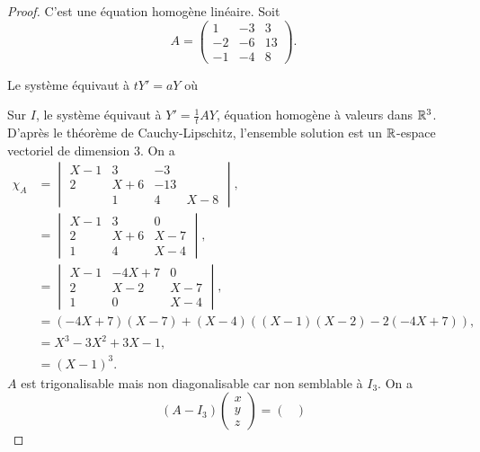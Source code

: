 \documentclass[12pt]{article}
\begin{document}
\begin{proof}
	C'est une équation homogène linéaire. Soit 
	\begin{equation}
		A=
		\begin{pmatrix}
			1&-3&3\\
			-2&-6&13\\
			-1&-4&8
		\end{pmatrix}.
	\end{equation}

	Le système équivaut à $tY'=aY$ où 

	Sur $I$, le système équivaut à $Y'=\frac{1}{t}AY$, équation homogène à valeurs dans $\mathbb{R}^{3}$. D'après le théorème de Cauchy-Lipschitz, l'ensemble solution est un $\mathbb{R}$-espace vectoriel de dimension 3. On a 
	\begin{align}
		\chi_{A}
		&=
		\begin{vmatrix}
			X-1&3&-3\\
			2&X+6&-13\\
			&1&4&X-8
		\end{vmatrix},\\
		&=
		\begin{vmatrix}
			X-1 &3&0\\
			2&X+6&X-7\\
			1&4&X-4	
		\end{vmatrix},\\
		&=
		\begin{vmatrix}
			X-1 &-4X+7&0\\
			2&X-2&X-7\\
			1&0&X-4
		\end{vmatrix},\\
		&=(-4X+7)(X-7)+(X-4)\left((X-1)(X-2)-2(-4X+7)\right),\\
		&=X^{3}-3X^{2}+3X-1,\\
		&=(X-1)^{3}.
	\end{align}
	$A$ est trigonalisable mais non diagonalisable car non semblable à $I_{3}$. On a 
	\begin{equation}
		(A-I_3)\begin{pmatrix}
			x\\y\\z
		\end{pmatrix}=\begin{pmatrix}

\end{pmatrix}
\end{equation}
\end{proof}
\end{document}
